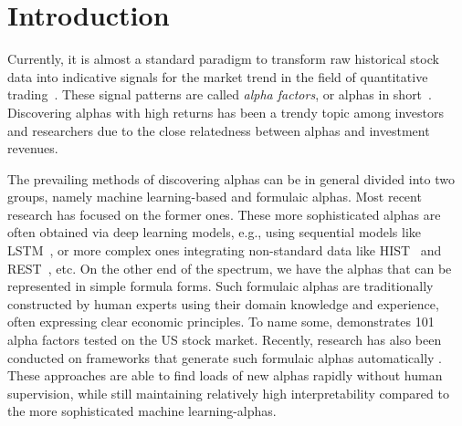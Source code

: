\section{Introduction}

Currently, it is almost a standard paradigm to transform raw historical stock data into indicative signals for the market trend in the field of quantitative trading~\cite{qian2007quantitative}.
These signal patterns are called \emph{alpha factors}, or {alphas} in short~\cite{tulchinsky15}. Discovering alphas with high returns has been a trendy topic among investors and researchers due to the close relatedness between alphas and investment revenues.

The prevailing methods of discovering alphas can be in general divided into two groups, namely machine learning-based and formulaic alphas. Most recent research has focused on the former ones. These more sophisticated alphas are often obtained via deep learning models, e.g., using sequential models like LSTM~\cite{lstm}, or more complex ones integrating non-standard data like HIST~\cite{hist} and REST~\cite{rest}, etc. 
On the other end of the spectrum, we have the alphas that can be represented in simple formula forms. Such formulaic alphas are traditionally constructed by human experts using their domain knowledge and experience, often expressing clear economic principles. To name some, \cite{alpha101} demonstrates 101 alpha factors tested on the US stock market. Recently, research has also been conducted on frameworks that generate such formulaic alphas automatically \cite{alphaevolve,autoalpha,huataigp,huataigp2}. These approaches are able to find loads of new alphas rapidly without human supervision, while still maintaining relatively high interpretability compared to the more sophisticated machine learning-alphas.


